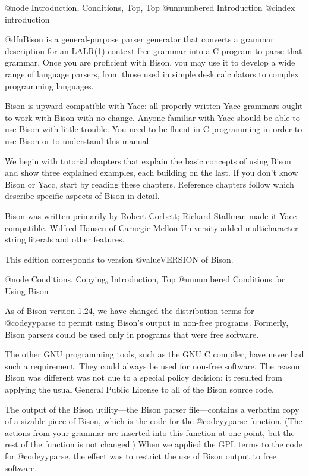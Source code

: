 @node Introduction, Conditions, Top, Top
@unnumbered Introduction
@cindex introduction

@dfn{Bison} is a general-purpose parser generator that converts a
grammar description for an LALR(1) context-free grammar into a C
program to parse that grammar.  Once you are proficient with Bison,
you may use it to develop a wide range of language parsers, from those
used in simple desk calculators to complex programming languages.

Bison is upward compatible with Yacc: all properly-written Yacc grammars
ought to work with Bison with no change.  Anyone familiar with Yacc
should be able to use Bison with little trouble.  You need to be fluent in
C programming in order to use Bison or to understand this manual.

We begin with tutorial chapters that explain the basic concepts of using
Bison and show three explained examples, each building on the last.  If you
don't know Bison or Yacc, start by reading these chapters.  Reference
chapters follow which describe specific aspects of Bison in detail.

Bison was written primarily by Robert Corbett; Richard Stallman made it
Yacc-compatible.  Wilfred Hansen of Carnegie Mellon University added
multicharacter string literals and other features.

This edition corresponds to version @value{VERSION} of Bison.

@node Conditions, Copying, Introduction, Top
@unnumbered Conditions for Using Bison

As of Bison version 1.24, we have changed the distribution terms for
@code{yyparse} to permit using Bison's output in non-free programs.
Formerly, Bison parsers could be used only in programs that were free
software.

The other GNU programming tools, such as the GNU C compiler, have never
had such a requirement.  They could always be used for non-free
software.  The reason Bison was different was not due to a special
policy decision; it resulted from applying the usual General Public
License to all of the Bison source code.

The output of the Bison utility---the Bison parser file---contains a
verbatim copy of a sizable piece of Bison, which is the code for the
@code{yyparse} function.  (The actions from your grammar are inserted
into this function at one point, but the rest of the function is not
changed.)  When we applied the GPL terms to the code for @code{yyparse},
the effect was to restrict the use of Bison output to free software.

